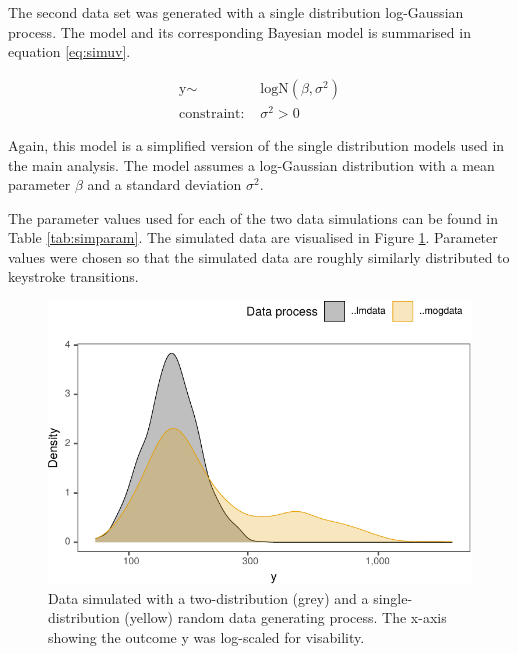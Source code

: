 \documentclass[
  man,floatsintext]{apa7}
\begin{document}
The second data set was generated with a single distribution log-Gaussian process. The model and its corresponding Bayesian model is summarised in equation \ref{eq:simuv}.

\begin{equation}
\begin{aligned}
\label{eq:simuv}
\text{y} \sim\text{ }& \text{logN}(\beta, \sigma^2)\\
\text{constraint: } & \sigma^2>0
\end{aligned}
\end{equation}

Again, this model is a simplified version of the single distribution models used in the main analysis. The model assumes a log-Gaussian distribution with a mean parameter \(\beta\) and a standard deviation \(\sigma^2\).

The parameter values used for each of the two data simulations can be found in Table \ref{tab:simparam}. The simulated data are visualised in Figure \ref{fig:simdata}. Parameter values were chosen so that the simulated data are roughly similarly distributed to keystroke transitions.

\begin{figure}

{\centering \includegraphics{manuscript_files/figure-latex/simdata-1} 

}

\caption{Data simulated with a two-distribution (grey) and a single-distribution (yellow) random data generating process. The x-axis showing the outcome y was log-scaled for visability.}\label{fig:simdata}
\end{figure}
\end{document}
